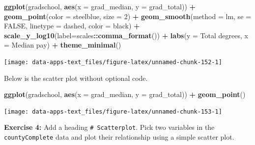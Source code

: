 \documentclass[
]{book}
\makeatletter
\newenvironment{Shaded}{\begin{snugshade}}{\end{snugshade}}
\newcommand{\AttributeTok}[1]{\textcolor[rgb]{0.27,0.27,0.27}{#1}}
\newcommand{\ConstantTok}[1]{\textcolor[rgb]{0.37,0.37,0.37}{#1}}
\newcommand{\DecValTok}[1]{\textcolor[rgb]{0.06,0.06,0.06}{#1}}
\newcommand{\FunctionTok}[1]{\textcolor[rgb]{0.27,0.27,0.27}{\textbf{#1}}}
\newcommand{\NormalTok}[1]{#1}
\newcommand{\SpecialCharTok}[1]{\textcolor[rgb]{0.43,0.43,0.43}{\textbf{#1}}}
\newcommand{\StringTok}[1]{\textcolor[rgb]{0.5,0.5,0.5}{#1}}
\newenvironment{kframe}{%
\medskip{}
\setlength{\fboxsep}{.8em}
 \def\at@end@of@kframe{}%
 \ifinner\ifhmode%
  \def\at@end@of@kframe{\end{minipage}}%
  \begin{minipage}{\columnwidth}%
 \fi\fi%
 \def\FrameCommand##1{\hskip\@totalleftmargin \hskip-\fboxsep
 \colorbox{shadecolor}{##1}\hskip-\fboxsep
     \hskip-\linewidth \hskip-\@totalleftmargin \hskip\columnwidth}%
 \MakeFramed {\advance\hsize-\width
   \@totalleftmargin\z@ \linewidth\hsize
   \@setminipage}}%
 {\par\unskip\endMakeFramed%
 \at@end@of@kframe}
\renewenvironment{Shaded}{\begin{kframe}}{\end{kframe}}
\newenvironment{rmdblock}[1]
  {\begin{shaded*}
  }
  {\end{shaded*}
  }
\newenvironment{learncheck}
  {\begin{rmdblock}{warning}}
  {\end{rmdblock}}
\makeatother
\begin{document}
\begin{Shaded}
\begin{Highlighting}[]
\FunctionTok{ggplot}\NormalTok{(gradschool, }\FunctionTok{aes}\NormalTok{(}\AttributeTok{x =}\NormalTok{ grad\_median, }\AttributeTok{y =}\NormalTok{ grad\_total)) }\SpecialCharTok{+}
  \FunctionTok{geom\_point}\NormalTok{(}\AttributeTok{color =} \StringTok{\textquotesingle{}steelblue\textquotesingle{}}\NormalTok{, }\AttributeTok{size =} \DecValTok{2}\NormalTok{) }\SpecialCharTok{+}
  \FunctionTok{geom\_smooth}\NormalTok{(}\AttributeTok{method =} \StringTok{\textquotesingle{}lm\textquotesingle{}}\NormalTok{, }\AttributeTok{se =} \ConstantTok{FALSE}\NormalTok{, }
              \AttributeTok{linetype =} \StringTok{\textquotesingle{}dashed\textquotesingle{}}\NormalTok{, }\AttributeTok{color =} \StringTok{\textquotesingle{}black\textquotesingle{}}\NormalTok{) }\SpecialCharTok{+}
  \FunctionTok{scale\_y\_log10}\NormalTok{(}\AttributeTok{label=}\NormalTok{scales}\SpecialCharTok{::}\FunctionTok{comma\_format}\NormalTok{()) }\SpecialCharTok{+}
  \FunctionTok{labs}\NormalTok{(}\AttributeTok{y =} \StringTok{\textquotesingle{}Total degrees\textquotesingle{}}\NormalTok{,}
       \AttributeTok{x =} \StringTok{\textquotesingle{}Median pay\textquotesingle{}}\NormalTok{) }\SpecialCharTok{+}
  \FunctionTok{theme\_minimal}\NormalTok{()}
\end{Highlighting}
\end{Shaded}

\begin{center}\texttt{[image: data-apps-text\_files/figure-latex/unnamed-chunk-152-1]} \end{center}

Below is the scatter plot without optional code.

\begin{Shaded}
\begin{Highlighting}[]
\FunctionTok{ggplot}\NormalTok{(gradschool, }\FunctionTok{aes}\NormalTok{(}\AttributeTok{x =}\NormalTok{ grad\_median, }\AttributeTok{y =}\NormalTok{ grad\_total)) }\SpecialCharTok{+}
  \FunctionTok{geom\_point}\NormalTok{()}
\end{Highlighting}
\end{Shaded}

\begin{center}\texttt{[image: data-apps-text\_files/figure-latex/unnamed-chunk-153-1]} \end{center}

\begin{learncheck}
\textbf{Exercise 4:} Add a heading \texttt{\#\ Scatterplot}. Pick two
variables in the \texttt{countyComplete} data and plot their
relationship using a simple scatter plot.
\end{learncheck}
\end{document}
